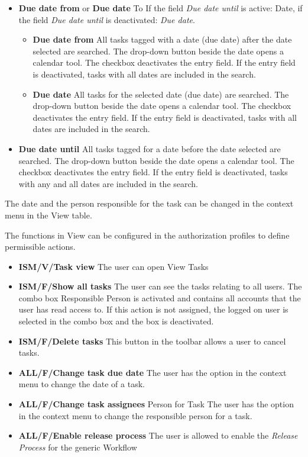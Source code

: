 \documentclass[a4paper,10pt]{book}
\begin{document}
\begin{itemize}
\item \textbf{Due date from} or \textbf{Due date} To If the field \textit{Due date until} is active: Date, if the field \textit{Due date until} is deactivated: \textit{Due date}.
\begin{itemize}
\item \textbf{Due date from} All tasks tagged with a date (due date) after the date selected are searched. The drop-down button beside the date opens a calendar tool. The checkbox deactivates the entry field. If the entry field is deactivated, tasks with all dates are included in the search.
\item \textbf{Due date} All tasks for the selected date (due date) are searched. The drop-down button beside the date opens a calendar tool. The checkbox deactivates the entry field. If the entry field is deactivated, tasks with all dates are included in the search.
\end{itemize}
\item \textbf{Due date until} All tasks tagged for a date before the date selected are searched. The drop-down button beside the date opens a calendar tool. The checkbox deactivates the entry field. If the entry field is deactivated, tasks with any and all dates are included in the search.
\end{itemize}

The date and the person responsible for the task can be changed in the context menu in the View table.

The functions in View can be configured in the authorization profiles to define permissible actions.
\begin{itemize}
\item \textbf{ISM/V/Task view} The user can open View Tasks
\item \textbf{ISM/F/Show all tasks} The user can see the tasks relating to all users. The combo box Responsible Person is activated and contains all accounts that the user has read access to. If this action is not assigned, the logged on user is selected in the combo box and the box is deactivated.
\item \textbf{ISM/F/Delete tasks} This button in the toolbar allows a user to cancel tasks.
\item \textbf{ALL/F/Change task due date} The user has the option in the context menu to change the date of a task.
\item \textbf{ALL/F/Change task assignees} Person for Task The user has the option in the context menu to change the responsible person for a task.
\item \textbf{ALL/F/Enable release process} The user is allowed to
  enable the \textit{Release Process} for the generic Workflow
\end{itemize}
\end{document}
